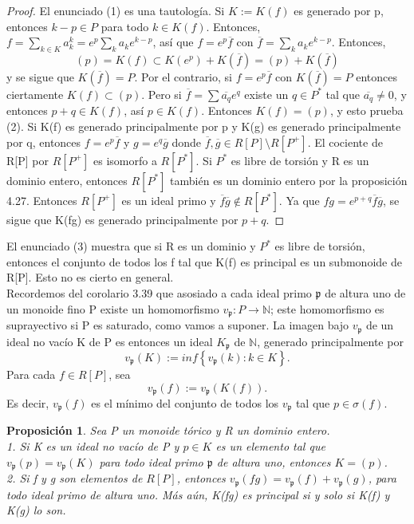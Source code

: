 \documentclass[12pt,spanish]{amsart}
\newcommand{\bb}[1]{\mathbb{#1}}
\newcommand{\fk}[1]{\mathfrak{#1}}
\newcommand{\set}[1]{\left\{{#1}\right\}}
\newtheorem{prop}[Theorem]{Proposición}
\theoremstyle{definition}
\theoremstyle{remark}
\begin{document}
\begin{proof}
El enunciado (1) es una tautología. Si $K:=K(f)$ es generado por p, entonces $k-p\in P$ para todo $k\in K(f)$. Entonces, $f= \sum_{k\in K} a_{k}^{k}=e^{p} \sum_{k} a_{k}e^{k-p}$, así que $f=e^{p}\overline{f}$ con $\overline{f}=\sum_{k} a_{k}e^{k-p}$. Entonces,
$$(p)=K(f) \subset K(e^{p}) + K(\overline{f}) =(p)+K(\overline{f})$$
y se sigue que $K(\overline{f})=P$. Por el contrario, si $f=e^{p}\overline{f}$ con $K(\overline{f})=P$ entonces ciertamente $K(f) \subset (p)$. Pero si $\overline{f}=\sum \overline{a_{q}}e^{q}$ existe un $q\in P^{\ast}$ tal que $\overline{a_{q}}\neq 0$, y entonces $p+q\in K(f)$, así $p\in K(f)$. Entonces $K(f)=(p)$, y esto prueba (2). Si K(f) es generado principalmente por p y K(g) es generado principalmente por q, entonces $f=e^{p} \overline{f}$ y $g=e^{q} \overline{g}$ donde $\overline{f},\overline{g} \in R[P]\setminus R[P^{+}]$. El cociente de R[P] por $R[P^{+}]$ es isomorfo a $R[P^{\ast}]$. Si $P^{\ast}$ es libre de torsión y R es un dominio entero, entonces $R[P^{\ast}]$ también es un dominio entero por la proposición 4.27. Entonces $R[P^{+}]$ es un ideal primo y $\overline{f} \overline{g} \notin R[P^{\ast}]$. Ya que $fg=e^{p+q}\overline{f} \overline{g}$, se sigue que K(fg) es generado principalmente por $p+q$. 
\end{proof}

El enunciado (3) muestra que si R es un dominio y $P^{\ast}$ es libre de torsión, entonces el conjunto de todos los f tal que K(f) es principal es un submonoide de R[P]. Esto no es cierto en general. \\

Recordemos del corolario 3.39 que asosiado a cada ideal primo $\fk{p}$ de altura uno de un monoide fino P existe un homomorfismo $v_{\fk{p}}:P \to \bb{N}$; este homomorfismo es suprayectivo si P es saturado, como vamos a suponer. La imagen bajo $v_{\fk{p}}$ de un ideal no vacío K de P es entonces un ideal $K_{\fk{p}}$ de $\bb{N}$, generado principalmente por 
$$v_{\fk{p}}(K):=inf \set{v_{\fk{p}}(k):k\in K}.$$
Para cada $f\in R[P]$, sea 
$$v_{\fk{p}}(f):=v_{\fk{p}}(K(f)).$$
Es decir, $v_{\fk{p}}(f)$ es el mínimo del conjunto de todos los $v_{\fk{p}}$ tal que $p\in \sigma(f)$.

\begin{prop}
Sea P un monoide tórico y R un dominio entero. \\
1. Si K es un ideal no vacío de P y $p\in K$ es un elemento tal que $v_{\fk{p}}(p)=v_{\fk{p}}(K)$ para todo ideal primo $\fk{p}$ de altura uno, entonces $K=(p)$. \\ 
2. Si f y g son elementos de $R[P]$, entonces $v_{\fk{p}}(fg)=v_{\fk{p}}(f)+v_{\fk{p}}(g)$, para todo ideal primo de altura uno. Más aún, K(fg) es principal si y solo si K(f) y K(g) lo son. 
\end{prop}
\end{document}
